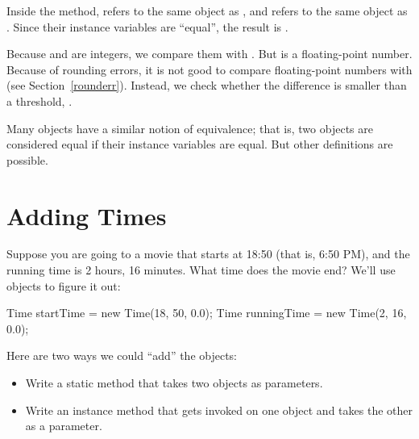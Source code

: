 Inside the  method,  refers to the same object as , and  refers to the same object as .
Since their instance variables are ``equal'', the result is .

Because  and  are integers, we compare them with \java{==}.
But  is a floating-point number.
Because of rounding errors, it is not good to compare floating-point numbers with \java{==} (see Section~\ref{rounderr}).
Instead, we check whether the difference is smaller than a threshold, .

Many objects have a similar notion of equivalence; that is, two objects are considered equal if their instance variables are equal.
But other definitions are possible.



%
%


\section{Adding Times}
\label{addingtime}

Suppose you are going to a movie that starts at 18:50 (that is, 6:50 PM), and the running time is 2 hours, 16 minutes.
What time does the movie end?
We'll use  objects to figure it out:

\begin{code}
Time startTime = new Time(18, 50, 0.0);
Time runningTime = new Time(2, 16, 0.0);
\end{code}


Here are two ways we could ``add'' the  objects:

\begin{itemize}

\item Write a static method that takes two  objects as parameters.

\item Write an instance method that gets invoked on one object and takes the other as a parameter.

\end{itemize}

